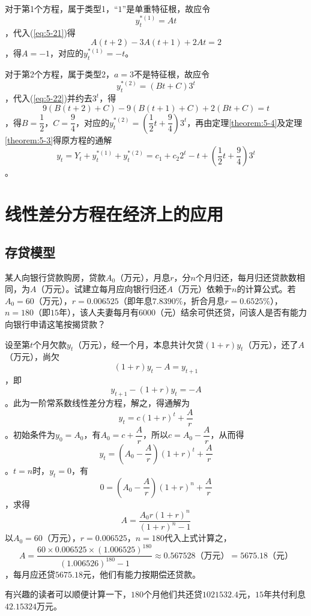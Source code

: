 		对于第1个方程，属于{\heiti 类型1}，“$1$”是单重特征根，故应令$$y^{*(1)}_t = At$$，代入(\ref{eq:5-21})得$$A(t+2) - 3A(t+1) + 2At = 2$$，得$A = -1$，对应的$y^{*(1)}_t = -t$。

		
		对于第2个方程，属于{\heiti 类型2}，$a=3$不是特征根，故应令$$y^{*(2)}_t = (Bt + C) 3^t$$，代入(\ref{eq:5-22})并约去$3^t$，得$$9(B(t + 2) + C) -9(B(t + 1) + C) + 2(Bt + C) = t$$，得$B = \dfrac{1}{2}$，$C = \dfrac{9}{4}$，对应的$y^{*(2)}_t = (\dfrac{1}{2} t + \dfrac{9}{4}) 3^t$，再由定理\ref{theorem:5-4}及定理\ref{theorem:5-3}得原方程的通解$$y_t = Y_t + y^{*(1)}_t + y^{*(2)}_t = c_1 + c_2 2^t - t + (\dfrac{1}{2}t + \dfrac{9}{4}) 3^t$$。

		\section{线性差分方程在经济上的应用}

		\subsection{存贷模型}

		\example 某人向银行贷款购房，贷款$A_0$（万元），月息$r$，分$n$个月归还，每月归还贷款数相同，为$A$（万元）。试建立每月应向银行归还$A$（万元）依赖于$n$的计算公式。若$A_0 = 60$（万元），$r = 0.006525$（即年息$7.8390 \%$，折合月息$r = 0.6525 \%$），$n = 180$（即$15$年），该人夫妻每月有$6000$（元）结余可供还贷，问该人是否有能力向银行申请这笔按揭贷款？

		\answer 设至第$t$个月欠款$y_t$（万元），经一个月，本息共计欠贷$(1+r)y_t$（万元），还了$A$（万元），尚欠$$(1+r)y_t - A = y_{t+1}$$，即$$y_{t+1} - (1+r) y_t = -A$$。此为一阶常系数线性差分方程，解之，得通解为$$y_t = c(1+r)^t + \frac{A}{r}$$。初始条件为$y_0 = A_0$，有$A_0 = c + \dfrac{A}{r}$，所以$c = A_0 - \dfrac{A}{r}$，从而得$$y_t = (A_0 - \frac{A}{r})(1+r)^t + \frac{A}{r}$$。$t = n$时，$y_t = 0$，有$$0 = (A_0 - \frac{A}{r})(1+r)^n + \frac{A}{r}$$，求得
		\begin{equation}\label{eq:5-23}
			A = \frac{A_0 r (1+r)^n}{(1+r)^n - 1}
		\end{equation}
		以$A_0 = 60$（万元），$r = 0.006525$，$n = 180$代入上式计算之，$$A = \frac{60 \times 0.006525 \times (1.006525) ^{180}}{(1.006526)^{180} - 1} \approx 0.567528 \text{（万元）} = 5675.18 \text{（元）}$$，每月应还贷$5675.18$元，他们有能力按期偿还贷款。

		有兴趣的读者可以顺便计算一下，$180$个月他们共还贷$1021532.4$元，$15$年共付利息$42.15324$万元。

